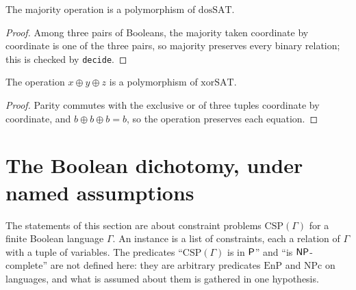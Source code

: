 \begin{theorem}
  \label{thm:structure-maj-dossat}
  \leanok
  The majority operation is a polymorphism of $\mathrm{dosSAT}$.
\end{theorem}

\begin{proof}
  \leanok
  Among three pairs of Booleans, the majority taken coordinate by coordinate is one of the three
  pairs, so majority preserves every binary relation; this is checked by \texttt{decide}.
\end{proof}

\begin{theorem}
  \label{thm:structure-maltsev-xorsat}
  \leanok
  The operation $x \oplus y \oplus z$ is a polymorphism of $\mathrm{xorSAT}$.
\end{theorem}

\begin{proof}
  \leanok
  Parity commutes with the exclusive or of three tuples coordinate by coordinate, and $b \oplus b
  \oplus b = b$, so the operation preserves each equation.
\end{proof}

\section{The Boolean dichotomy, under named assumptions}
\label{sec:structure-dichotomy}

The statements of this section are about constraint problems $\mathrm{CSP}(\Gamma)$ for a finite
Boolean language $\Gamma$. An instance is a list of constraints, each a relation of $\Gamma$ with a
tuple of variables. The predicates ``$\mathrm{CSP}(\Gamma)$ is in $\mathsf{P}$'' and ``is
$\mathsf{NP}$-complete'' are not defined here: they are arbitrary predicates $\mathrm{EnP}$ and
$\mathrm{NPc}$ on languages, and what is assumed about them is gathered in one hypothesis.

